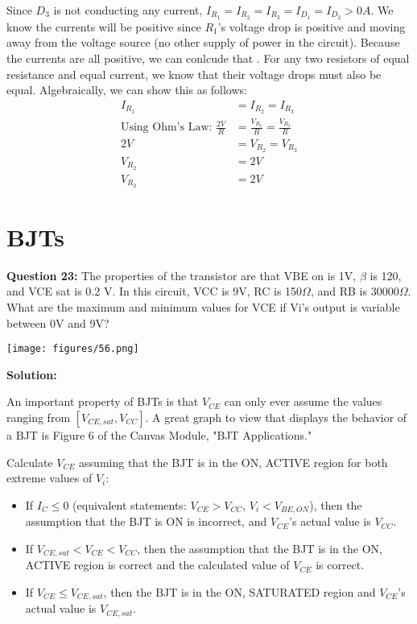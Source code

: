 \documentclass{article}
\begin{document}
Since $D_3$ is not conducting any current, $I_{R_1} = I_{R_2} = I_{R_3} = I_{D_1} = I_{D_2} > 0A $. 
We know the currents will be positive since $R_1$'s voltage drop is positive and moving away from the voltage source 
(no other supply of power in the circuit). 
Because the currents are all positive, we can conlcude that . 
For any two resistors of equal resistance and equal current, 
we know that their voltage drops must also be equal.
 Algebraically, we can show this as follows:
\begin{align*}
    I_{R_1} &= I_{R_2} = I_{R_3} \\
    \text{Using Ohm's Law: }\frac{2V}{R} &= \frac{V_{R_2}}{R} = \frac{V_{R_3}}{R} \\
    2V &= V_{R_2} = V_{R_3} \\ 
    V_{R_2} &= \boxed {2V } \\
    V_{R_3} &= \boxed {2V }
\end{align*} 



\pagebreak

\section*{BJTs}
\textbf{Question 23:} The properties of the transistor are that VBE on is 1V, \(\beta\) is 120, and VCE sat is 0.2 V. In this circuit, VCC is 9V, RC is 150\(\Omega\), and RB is 30000\(\Omega\). What are the maximum and minimum values for VCE if Vi’s output is variable between 0V and 9V?

\begin{center}

    \texttt{[image: figures/56.png]}
\end{center}

\textbf{Solution:} 

An important property of BJTs is that $V_{CE}$ can only ever assume the values ranging from $[V_{CE,sat},V_{CC}]$. A great graph to view that displays the behavior of a BJT is Figure 6 of the Canvas Module, "BJT Applications."

Calculate $V_{CE}$ assuming that the BJT is in the ON, ACTIVE region for both extreme values of $V_i$:
\begin{itemize}
    \item If $I_C \le 0$ (equivalent statements: $V_{CE} > V_{CC}$, $V_i < V_{BE,ON}$), then the assumption that the BJT is ON is incorrect, and $V_{CE}$'s actual value is $V_{CC}$.
    \item If $V_{CE,sat} < V_{CE} < V_{CC}$, then the assumption that the BJT is in the ON, ACTIVE region is correct and the calculated value of $V_{CE}$ is correct.
    \item If $V_{CE} \le V_{CE,sat}$, then the BJT is in the ON, SATURATED region and $V_{CE}$'s actual value is $V_{CE,sat}$.
\end{itemize}
\end{document}
